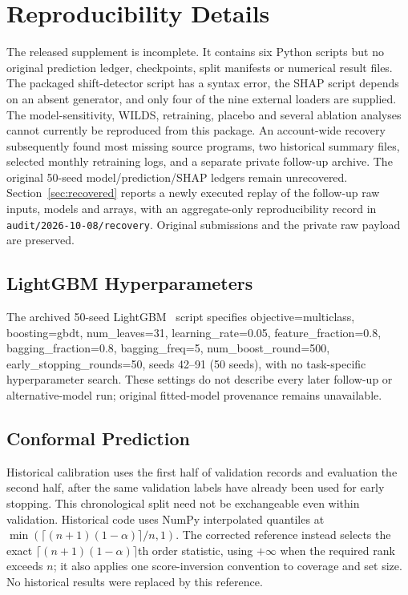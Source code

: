 \documentclass[accepted]{uai2026} %
\begin{document}
\appendix

\section{Reproducibility Details}\label{app:reproducibility}

The released supplement is incomplete. It contains six Python scripts but no original prediction ledger, checkpoints, split manifests or numerical result files. The packaged shift-detector script has a syntax error, the SHAP script depends on an absent generator, and only four of the nine external loaders are supplied. The model-sensitivity, WILDS, retraining, placebo and several ablation analyses cannot currently be reproduced from this package. An account-wide recovery subsequently found most missing source programs, two historical summary files, selected monthly retraining logs, and a separate private follow-up archive. The original 50-seed model/prediction/SHAP ledgers remain unrecovered. Section~\ref{sec:recovered} reports a newly executed replay of the follow-up raw inputs, models and arrays, with an aggregate-only reproducibility record in \texttt{audit/2026-10-08/recovery}. Original submissions and the private raw payload are preserved.

\subsection{LightGBM Hyperparameters}

The archived 50-seed LightGBM~\citep{ke2017lightgbm} script specifies objective=multiclass, boosting=gbdt, num\_leaves=31, learning\_rate=0.05, feature\_fraction=0.8, bagging\_fraction=0.8, bagging\_freq=5, num\_boost\_round=500, early\_stopping\_rounds=50, seeds 42--91 (50 seeds), with no task-specific hyperparameter search. These settings do not describe every later follow-up or alternative-model run; original fitted-model provenance remains unavailable.

\subsection{Conformal Prediction}

Historical calibration uses the first half of validation records and evaluation the second half, after the same validation labels have already been used for early stopping. This chronological split need not be exchangeable even within validation. Historical code uses NumPy interpolated quantiles at $\min(\lceil(n+1)(1-\alpha)\rceil/n,1)$. The corrected reference instead selects the exact $\lceil(n+1)(1-\alpha)\rceil$th order statistic, using $+\infty$ when the required rank exceeds $n$; it also applies one score-inversion convention to coverage and set size. No historical results were replaced by this reference.
\end{document}
